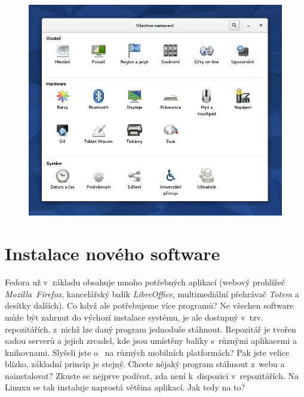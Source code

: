 \begin{figure}[t]
\begin{center}
\includegraphics[width=\textwidth]{img/nastaveni}
 \label{fig:nastaveni}
\end{center}
\end{figure}

\section*{Instalace nového software}
Fedora už v~základu obsahuje mnoho potřebných aplikací (webový prohlížeč \emph{Mozilla~Firefox}, kancelářský balík \emph{LibreOffice}, multimediální přehrávač \emph{Totem} a desítky dalších). Co když ale potřebujeme více programů? Ne všechen software může být zahrnut do výchozí instalace systému, je ale dostupný v~tzv. repozitářích, z~nichž lze daný program jednoduše stáhnout. Repozitář je tvořen sadou serverů a jejich zrcadel, kde jsou umístěny balíky s~různými aplikacemi a knihovnami. Slyšeli jste o~ na různých mobilních platformách? Pak jste velice blízko, základní princip je stejný. Chcete nějaký program stáhnout z~webu a nainstalovat? Zkuste se nejprve podívat, zda není k~dispozici v~repozitářích. Na Linuxu se tak instaluje naprostá většina aplikací. Jak tedy na to?


